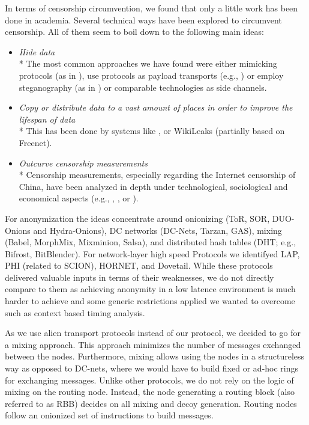 \documentclass[acmsmall, screen, review]{acmart}
\begin{document}
In terms of censorship circumvention, we found that only a little work has been done in academia. Several technical ways have been explored to circumvent censorship. All of them seem to boil down to the following main ideas:
\begin{itemize}
	\item \emph{Hide data}\\*
	The most common approaches we have found were either mimicking protocols (as in \cite{mohajeri2013skypemorph}), use protocols as payload transports (e.g., \cite{AthanRAM07}) or employ steganography (as in \cite{f5}) or comparable technologies as side channels.
	\item \emph{Copy or distribute data to a vast amount of places in order to improve the lifespan of data}\\*
	This has been done by systems like \cite{freenet}, or WikiLeaks (partially based on Freenet).
	\item \emph{Outcurve censorship measurements}\\*
	Censorship measurements, especially regarding the Internet censorship of China, have been analyzed in depth under technological, sociological and economical aspects (e.g., \cite{Ensafi:2015}, \cite{Clayton:2006}, or \cite{lowe2007great}).
\end{itemize}

For anonymization the ideas concentrate around onionizing (ToR\cite{tor-spec}, SOR\cite{Egners_2012}, DUO-Onions and Hydra-Onions\cite{iwanik2005duo}), DC networks (DC-Nets\cite{chaum-dc}, Tarzan\cite{tarzan:ccs02}, GAS\cite{AthanRAM07}), mixing (Babel\cite{babel}, MorphMix\cite{morphmix:wpes2002}, Mixminion\cite{minion-design}, Salsa\cite{Salsa}), and distributed hash tables (DHT; e.g., Bifrost\cite{Kondo2009}, BitBlender\cite{Bauer:2008}). For network-layer high speed Protocols we identifyed LAP\cite{hsiao2012lap}, PHI (related to SCION\cite{perrig2017scion}), HORNET\cite{chen2015hornet}, and Dovetail\cite{chen2015hornet}. While these protocols delivered valuable inputs in terms of their weaknesses, we do not directly compare to them as achieving anonymity in a low latence environment is much harder to achieve and some generic restrictions applied we wanted to overcome such as context based timing analysis.

As we use alien transport protocols instead of our protocol, we decided to go for a mixing approach. This approach minimizes the number of messages exchanged between the nodes. Furthermore, mixing allows using the nodes in a structureless way as opposed to DC-nets, where we would have to build fixed or ad-hoc rings for exchanging messages. Unlike other protocols, we do not rely on the logic of mixing on the routing node. Instead, the node generating a routing block (also referred to as RBB) decides on all mixing and decoy generation. Routing nodes follow an onionized set of instructions to build messages. 
\end{document}
